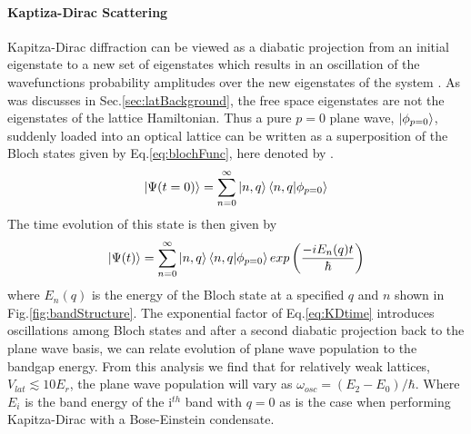 \paragraph{Kaptiza-Dirac Scattering}
Kapitza-Dirac diffraction can be viewed as a diabatic projection from an initial eigenstate to a new set of eigenstates which results in an oscillation of the wavefunctions probability amplitudes over the new eigenstates of the system \cite{Denschlag2002}.
As was discusses in Sec.\;\ref{sec:latBackground}, the free space eigenstates are not the eigenstates of the lattice Hamiltonian. 
Thus a pure $p=0$ plane wave, $\left| {\phi_{p=0}} \right>$, suddenly loaded into an optical lattice can be written as a superposition of the Bloch states given by Eq.\;\ref{eq:blochFunc}, here denoted by .
	\begin{equation} \label{eq:p0inBloch}
		\left| {\Psi(t=0)} \right> = \sum_{n=0}^{\infty} \left| {n,q} \right> \left< {n,q} | {\phi_{p=0}} \right>
	\end{equation}
The time evolution of this state is then given by
	\begin{equation} \label{eq:KDtime}
		\left| {\Psi(t)} \right> = \sum_{n=0}^{\infty} \left| {n,q} \right> \left< {n,q} | {\phi_{p=0}} \right> exp \left( \frac{-i E_n(q) t}{\hbar} \right)
	\end{equation}
where $E_n(q)$ is the energy of the Bloch state at a specified $q$ and $n$ shown in Fig.\;\ref{fig:bandStructure}.
The exponential factor of Eq.\;\ref{eq:KDtime} introduces oscillations among Bloch states and after a second diabatic projection back to the plane wave basis, we can relate evolution of plane wave population to the bandgap energy.
From this analysis we find that for relatively weak lattices, $V_{lat} \lesssim 10 E_r$, the plane wave population will vary as $\omega_{osc} = (E_2 - E_0) / \hbar$.
Where $E_i$ is the band energy of the i$^{th}$ band with $q=0$ as is the case when performing Kapitza-Dirac with a Bose-Einstein condensate.

